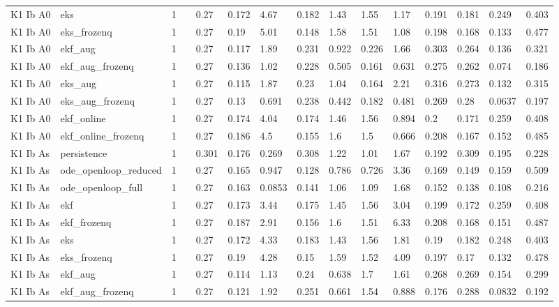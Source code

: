 \begin{table}[t]
\begin{tabular}{lllllllllllllll}
K1 Ib A0 & eks & 1 &  & 0.27 & 0.172 & 4.67 & 0.182 & 1.43 & 1.55 & 1.17 & 0.191 & 0.181 & 0.249 & 0.403 \\
K1 Ib A0 & eks\_frozenq & 1 &  & 0.27 & 0.19 & 5.01 & 0.148 & 1.58 & 1.51 & 1.08 & 0.198 & 0.168 & 0.133 & 0.477 \\
K1 Ib A0 & ekf\_aug & 1 &  & 0.27 & 0.117 & 1.89 & 0.231 & 0.922 & 0.226 & 1.66 & 0.303 & 0.264 & 0.136 & 0.321 \\
K1 Ib A0 & ekf\_aug\_frozenq & 1 &  & 0.27 & 0.136 & 1.02 & 0.228 & 0.505 & 0.161 & 0.631 & 0.275 & 0.262 & 0.074 & 0.186 \\
K1 Ib A0 & eks\_aug & 1 &  & 0.27 & 0.115 & 1.87 & 0.23 & 1.04 & 0.164 & 2.21 & 0.316 & 0.273 & 0.132 & 0.315 \\
K1 Ib A0 & eks\_aug\_frozenq & 1 &  & 0.27 & 0.13 & 0.691 & 0.238 & 0.442 & 0.182 & 0.481 & 0.269 & 0.28 & 0.0637 & 0.197 \\
K1 Ib A0 & ekf\_online & 1 &  & 0.27 & 0.174 & 4.04 & 0.174 & 1.46 & 1.56 & 0.894 & 0.2 & 0.171 & 0.259 & 0.408 \\
K1 Ib A0 & ekf\_online\_frozenq & 1 &  & 0.27 & 0.186 & 4.5 & 0.155 & 1.6 & 1.5 & 0.666 & 0.208 & 0.167 & 0.152 & 0.485 \\
K1 Ib As & persistence & 1 &  & 0.301 & 0.176 & 0.269 & 0.308 & 1.22 & 1.01 & 1.67 & 0.192 & 0.309 & 0.195 & 0.228 \\
K1 Ib As & ode\_openloop\_reduced & 1 &  & 0.27 & 0.165 & 0.947 & 0.128 & 0.786 & 0.726 & 3.36 & 0.169 & 0.149 & 0.159 & 0.509 \\
K1 Ib As & ode\_openloop\_full & 1 &  & 0.27 & 0.163 & 0.0853 & 0.141 & 1.06 & 1.09 & 1.68 & 0.152 & 0.138 & 0.108 & 0.216 \\
K1 Ib As & ekf & 1 &  & 0.27 & 0.173 & 3.44 & 0.175 & 1.45 & 1.56 & 3.04 & 0.199 & 0.172 & 0.259 & 0.408 \\
K1 Ib As & ekf\_frozenq & 1 &  & 0.27 & 0.187 & 2.91 & 0.156 & 1.6 & 1.51 & 6.33 & 0.208 & 0.168 & 0.151 & 0.487 \\
K1 Ib As & eks & 1 &  & 0.27 & 0.172 & 4.33 & 0.183 & 1.43 & 1.56 & 1.81 & 0.19 & 0.182 & 0.248 & 0.403 \\
K1 Ib As & eks\_frozenq & 1 &  & 0.27 & 0.19 & 4.28 & 0.15 & 1.59 & 1.52 & 4.09 & 0.197 & 0.17 & 0.132 & 0.478 \\
K1 Ib As & ekf\_aug & 1 &  & 0.27 & 0.114 & 1.13 & 0.24 & 0.638 & 1.7 & 1.61 & 0.268 & 0.269 & 0.154 & 0.299 \\
K1 Ib As & ekf\_aug\_frozenq & 1 &  & 0.27 & 0.121 & 1.92 & 0.251 & 0.661 & 1.54 & 0.888 & 0.176 & 0.288 & 0.0832 & 0.192 \\

\end{tabular}
\end{table}
